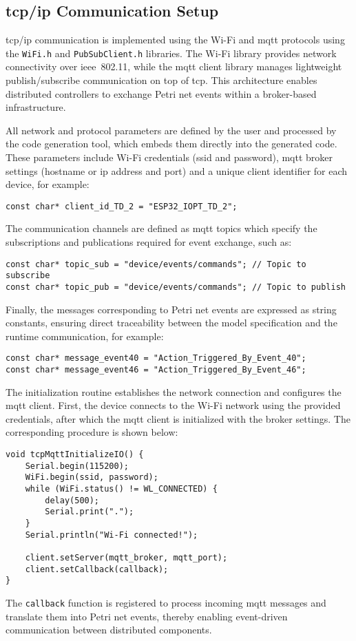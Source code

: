 \subsection{\gls{tcp}/\gls{ip} Communication Setup}
\gls{tcp}/\gls{ip} communication is implemented using the Wi-Fi and \gls{mqtt} protocols using the \texttt{WiFi.h} and \texttt{PubSubClient.h} libraries. The Wi-Fi library provides network connectivity over \gls{ieee}~802.11, while the \gls{mqtt} client library manages lightweight publish/subscribe communication on top of \gls{tcp}. This architecture enables distributed controllers to exchange Petri net events within a broker-based infrastructure.

All network and protocol parameters are defined by the user and processed by the code generation tool, which embeds them directly into the generated code. These parameters include Wi-Fi credentials (\gls{ssid} and password), \gls{mqtt} broker settings (hostname or \gls{ip} address and port) and a unique client identifier for each device, for example:
\begin{verbatim}
const char* client_id_TD_2 = "ESP32_IOPT_TD_2";
\end{verbatim}
The communication channels are defined as \gls{mqtt} topics which specify the subscriptions and publications required for event exchange, such as:
\begin{verbatim}
const char* topic_sub = "device/events/commands"; // Topic to subscribe
const char* topic_pub = "device/events/commands"; // Topic to publish
\end{verbatim}
Finally, the messages corresponding to Petri net events are expressed as string constants, ensuring direct traceability between the model specification and the runtime communication, for example:
\begin{verbatim}
const char* message_event40 = "Action_Triggered_By_Event_40";
const char* message_event46 = "Action_Triggered_By_Event_46";
\end{verbatim}

The initialization routine establishes the network connection and configures the \gls{mqtt} client. First, the device connects to the Wi-Fi network using the provided credentials, after which the \gls{mqtt} client is initialized with the broker settings. The corresponding procedure is shown below:
\begin{verbatim}
void tcpMqttInitializeIO() {
    Serial.begin(115200);
    WiFi.begin(ssid, password);
    while (WiFi.status() != WL_CONNECTED) {
        delay(500);
        Serial.print(".");
    }
    Serial.println("Wi-Fi connected!");

    client.setServer(mqtt_broker, mqtt_port);
    client.setCallback(callback);
}
\end{verbatim}
The \texttt{callback} function is registered to process incoming \gls{mqtt} messages and translate them into Petri net events, thereby enabling event-driven communication between distributed components.



